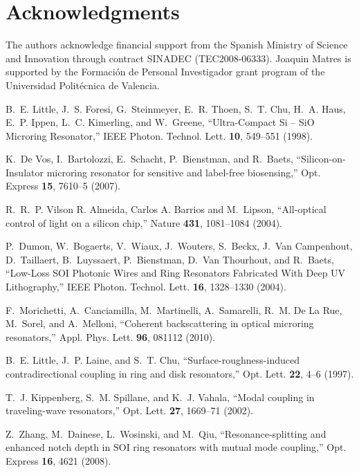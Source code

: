 \section*{Acknowledgments}
The authors acknowledge financial support from the Spanish Ministry of Science and Innovation through contract SINADEC (TEC2008-06333). Joaquin Matres is supported by the Formaci\'on de Personal Investigador grant program of the Universidad Polit\'ecnica de Valencia.

\begin{thebibliography}{10}
\newcommand{\enquote}[1]{``#1''}

B.~E. Little, J.~S. Foresi, G.~Steinmeyer, E.~R. Thoen, S.~T. Chu, H.~A. Haus,
  E.~P. Ippen, L.~C. Kimerling, and W.~Greene, \enquote{{Ultra-Compact Si –
  SiO Microring Resonator},} IEEE Photon. Technol. Lett. \textbf{10}, 549--551 (1998).

K.~{De Vos}, I.~Bartolozzi, E.~Schacht, P.~Bienstman, and R.~Baets,
  \enquote{{Silicon-on-Insulator microring resonator for sensitive and
  label-free biosensing},} Opt. Express \textbf{15}, 7610--5 (2007).

R.~R.~P. {Vilson R. Almeida, Carlos A. Barrios} and M.~Lipson,
  \enquote{{All-optical control of light on a silicon chip},} Nature
  \textbf{431}, 1081--1084 (2004).

P.~Dumon, W.~Bogaerts, V.~Wiaux, J.~Wouters, S.~Beckx, J.~{Van Campenhout},
  D.~Taillaert, B.~Luyssaert, P.~Bienstman, D.~{Van Thourhout}, and R.~Baets,
  \enquote{{Low-Loss SOI Photonic Wires and Ring Resonators Fabricated With
  Deep UV Lithography},} IEEE Photon. Technol. Lett. \textbf{16},
  1328--1330 (2004).

F.~Morichetti, A.~Canciamilla, M.~Martinelli, A.~Samarelli, R.~M. {De La Rue},
  M.~Sorel, and A.~Melloni, \enquote{{Coherent backscattering in optical
  microring resonators},} Appl. Phys. Lett. \textbf{96}, 081112 (2010).

B.~E. Little, J.~P. Laine, and S.~T. Chu, \enquote{{Surface-roughness-induced
  contradirectional coupling in ring and disk resonators},} Opt. Lett.
  \textbf{22}, 4--6 (1997).

T.~J. Kippenberg, S.~M. Spillane, and K.~J. Vahala, \enquote{{Modal coupling in
  traveling-wave resonators},} Opt. Lett. \textbf{27}, 1669--71 (2002).

Z.~Zhang, M.~Dainese, L.~Wosinski, and M.~Qiu, \enquote{{Resonance-splitting
  and enhanced notch depth in SOI ring resonators with mutual mode coupling},}
  Opt. Express \textbf{16}, 4621 (2008).


\end{thebibliography}
